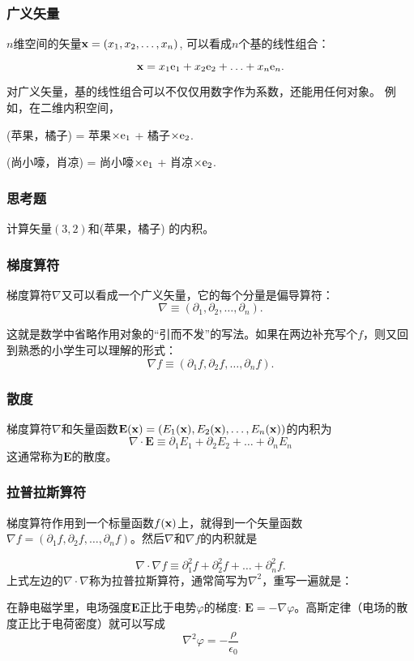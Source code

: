 \documentclass[CJK,13pt]{beamer}
\begin{document}
\begin{frame}
  \frametitle{广义矢量}
  
  $n$维空间的矢量${\mathbf{x}} = (x_1, x_2, \ldots, x_n)$, 可以看成$n$个基的线性组合：

  $${\mathbf{x}} = x_1\mathrm{e}_1 + x_2\mathrm{e}_2 + \ldots + x_n\mathrm{e}_n. $$

  对广义矢量，{\blue 基的线性组合可以不仅仅用数字作为系数，还能用任何对象。}
  例如，在二维内积空间，

  \skipline
  
  (苹果，橘子) = 苹果$\times \mathrm{e}_1$ + 橘子$\times\mathrm{e}_2$.

  \skipline
  
  (尚小嚎，肖凉) = 尚小嚎$\times \mathrm{e}_1$ + 肖凉$\times\mathrm{e}_2$.  
  
  
\end{frame}


\begin{frame}
  \frametitle{思考题}
  
  计算矢量$(3,2)$和(苹果，橘子) 的内积。
  
\end{frame}

\begin{frame}
  \frametitle{梯度算符}
  
  梯度算符$\nabla$又可以看成一个广义矢量，它的每个分量是偏导算符：
  $$\nabla \equiv (\partial_1, \partial_2,\ldots, \partial_n). $$

  这就是数学中省略作用对象的“引而不发”的写法。如果在两边补充写个$f$，则又回到熟悉的小学生可以理解的形式：
  $$\nabla f \equiv (\partial_1f, \partial_2f,\ldots, \partial_nf). $$
  
\end{frame}

\begin{frame}
  \frametitle{散度}
  
  梯度算符$\nabla$和矢量函数$\mathbf{E}({\mathbf{x}}) = \left(E_1({\mathbf{x}}), E_2({\mathbf{x}}), \ldots, E_n({\mathbf{x}})\right)$的内积为
  $$\nabla\cdot \mathbf{E} \equiv \partial_1 E_1 + \partial_2 E_2 + \ldots + \partial_n E_n $$
  这通常称为$\mathbf{E}$的{\blue 散度}。
  \skipline
  
  
\end{frame}

\begin{frame}
  \frametitle{拉普拉斯算符}
  
  梯度算符作用到一个标量函数$f({\mathbf{x}})$上，就得到一个矢量函数$\nabla f = (\partial_1 f, \partial_2 f, \ldots, \partial_n f)$。然后$\nabla$和$\nabla f$的内积就是
  
  $$ \nabla \cdot \nabla f \equiv \partial_1^2 f + \partial_2^2 f + \ldots + \partial_n^2 f.$$
  上式左边的$\nabla\cdot \nabla$称为{\blue 拉普拉斯算符}，通常简写为{\blue $\nabla^2$}，重写一遍就是：
  
  {
    \small
  在静电磁学里，电场强度$\mathbf{E}$正比于电势$\varphi$的梯度: $\mathbf{E} = -\nabla \varphi$。高斯定律（电场的散度正比于电荷密度）就可以写成
  $$ \nabla^2 \varphi = -\frac{\rho}{\epsilon_0} $$}
  
  
\end{frame}
\end{document}
